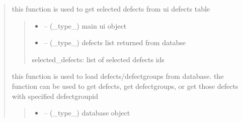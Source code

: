 \documentclass[letterpaper,10pt,english]{sphinxmanual}
\begin{document}
\begin{quote}
\begin{savenotes}\begin{fulllineitems}
\label{\detokenize{setting/backend/defect_management_funcs:oxin.backend.defect_management_funcs.get_selected_defects}}
\pysigstartsignatures
{}
\pysigstopsignatures
\sphinxAtStartPar
this function is used to get selected defects from ui defects table
\begin{quote}\begin{description}
\begin{itemize}
\item {} 
\sphinxAtStartPar
{} – (\_type\_) main ui object

\item {} 
\sphinxAtStartPar
{} – (\_type\_) defects list returned from databse

\end{itemize}

\sphinxAtStartPar
selected\_defects: list of selected defects ids

\end{description}\end{quote}

\end{fulllineitems}\end{savenotes}


\begin{savenotes}\begin{fulllineitems}
\label{\detokenize{setting/backend/defect_management_funcs:oxin.backend.defect_management_funcs.load_defects_from_db}}
\pysigstartsignatures
{}
\pysigstopsignatures
\sphinxAtStartPar
this function is used to load defects/defect\sphinxhyphen{}groups from database.
the function can be used to get defects, get defect\sphinxhyphen{}groups, or get those defects with specified defect\sphinxhyphen{}group\sphinxhyphen{}id
\begin{quote}\begin{description}
\begin{itemize}
\item {} 
\sphinxAtStartPar
{} – (\_type\_) database object


\end{itemize}
\end{description}
\end{quote}
\end{fulllineitems}
\end{savenotes}
\end{quote}
\end{document}
